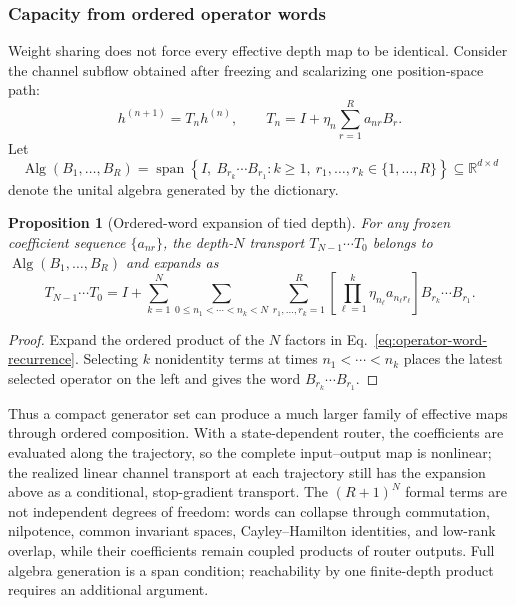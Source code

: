 \documentclass[10pt]{article}
\newcommand{\Span}{\operatorname{span}}
\newtheorem{proposition}[theorem]{Proposition}
\theoremstyle{definition}
\theoremstyle{remark}
\newcommand{\BookSubsection}[1]{\subsubsection{#1}}
\begin{document}
\BookSubsection{Capacity from ordered operator words}

Weight sharing does not force every effective depth map to be identical.  Consider the channel
subflow obtained after freezing and scalarizing one position-space path:
\begin{equation}
h^{(n+1)}
=T_nh^{(n)},
\qquad
T_n=I+\eta_n\sum_{r=1}^{R}a_{nr}B_r.
\label{eq:operator-word-recurrence}
\end{equation}
Let
\begin{equation}
\operatorname{Alg}(B_1,\ldots,B_R)
=\Span\left\{
I,\ B_{r_k}\cdots B_{r_1}:k\geq1,\ r_1,\ldots,r_k\in\{1,\ldots,R\}
\right\}
\subseteq\mathbb R^{d\times d}
\label{eq:generated-operator-algebra}
\end{equation}
denote the unital algebra generated by the dictionary.

\begin{proposition}[Ordered-word expansion of tied depth]
\label{prop:ordered-operator-words}
For any frozen coefficient sequence $\{a_{nr}\}$, the depth-$N$ transport
$T_{N-1}\cdots T_0$ belongs to $\operatorname{Alg}(B_1,\ldots,B_R)$ and expands as
\begin{equation}
T_{N-1}\cdots T_0
=I+
\sum_{k=1}^{N}
\sum_{0\le n_1<\cdots<n_k<N}
\sum_{r_1,\ldots,r_k=1}^{R}
\left[
\prod_{\ell=1}^{k}\eta_{n_\ell}a_{n_\ell r_\ell}
\right]
B_{r_k}\cdots B_{r_1}.
\label{eq:ordered-operator-word-expansion}
\end{equation}
\end{proposition}

\begin{proof}
Expand the ordered product of the $N$ factors in
Eq.~\ref{eq:operator-word-recurrence}.  Selecting $k$ nonidentity terms at times
$n_1<\cdots<n_k$ places the latest selected operator on the left and gives the word
$B_{r_k}\cdots B_{r_1}$.
\end{proof}

Thus a compact generator set can produce a much larger family of effective maps through ordered
composition.  With a state-dependent router, the coefficients are evaluated along the trajectory,
so the complete input--output map is nonlinear; the realized linear channel transport at each
trajectory still has the expansion above as a conditional, stop-gradient transport.  The
$(R+1)^N$ formal terms are not independent degrees of freedom: words can collapse through
commutation, nilpotence, common invariant spaces, Cayley--Hamilton identities, and low-rank
overlap, while their coefficients remain coupled products of router outputs.  Full algebra
generation is a span condition; reachability by one finite-depth product requires an additional
argument.
\end{document}
